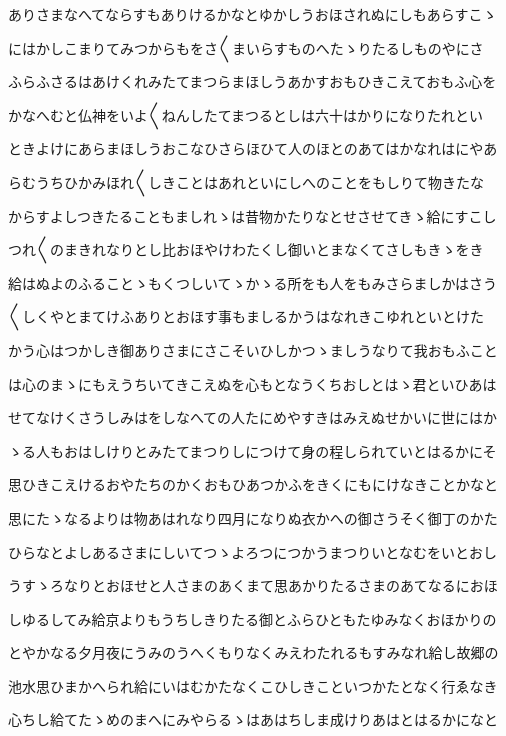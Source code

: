 \documentclass[a4paper,11pt,landscape]{ltjtarticle}
\begin{document}
ありさまなへてならすもありけるかなとゆかしうおほされぬにしもあらすこゝ
\par\medskip
にはかしこまりてみつからもをさ〱まいらすものへたゝりたるしものやにさ
\par\medskip
ふらふさるはあけくれみたてまつらまほしうあかすおもひきこえておもふ心を
\par\medskip
かなへむと仏神をいよ〱ねんしたてまつるとしは六十はかりになりたれとい
\par\medskip
ときよけにあらまほしうおこなひさらほひて人のほとのあてはかなれはにやあ
\par\medskip
らむうちひかみほれ〱しきことはあれといにしへのことをもしりて物きたな
\par\medskip
からすよしつきたることもましれゝは昔物かたりなとせさせてきゝ給にすこし
\par\medskip
つれ〱のまきれなりとし比おほやけわたくし御いとまなくてさしもきゝをき
\par\medskip
給はぬよのふることゝもくつしいてゝかゝる所をも人をもみさらましかはさう
\par\medskip
〱しくやとまてけふありとおほす事もましるかうはなれきこゆれといとけた
\par\medskip
かう心はつかしき御ありさまにさこそいひしかつゝましうなりて我おもふこと
\par\medskip
は心のまゝにもえうちいてきこえぬを心もとなうくちおしとはゝ君といひあは
\par\medskip
せてなけくさうしみはをしなへての人たにめやすきはみえぬせかいに世にはか
\par\medskip
ゝる人もおはしけりとみたてまつりしにつけて身の程しられていとはるかにそ
\par\medskip
思ひきこえけるおやたちのかくおもひあつかふをきくにもにけなきことかなと
\par\medskip
思にたゝなるよりは物あはれなり四月になりぬ衣かへの御さうそく御丁のかた
\par\medskip
ひらなとよしあるさまにしいてつゝよろつにつかうまつりいとなむをいとおし
\par\medskip
うすゝろなりとおほせと人さまのあくまて思あかりたるさまのあてなるにおほ
\par\medskip
しゆるしてみ給京よりもうちしきりたる御とふらひともたゆみなくおほかりの
\par\medskip
とやかなる夕月夜にうみのうへくもりなくみえわたれるもすみなれ給し故郷の
\par\medskip
池水思ひまかへられ給にいはむかたなくこひしきこといつかたとなく行ゑなき
\par\medskip
心ちし給てたゝめのまへにみやらるゝはあはちしま成けりあはとはるかになと
\end{document}
